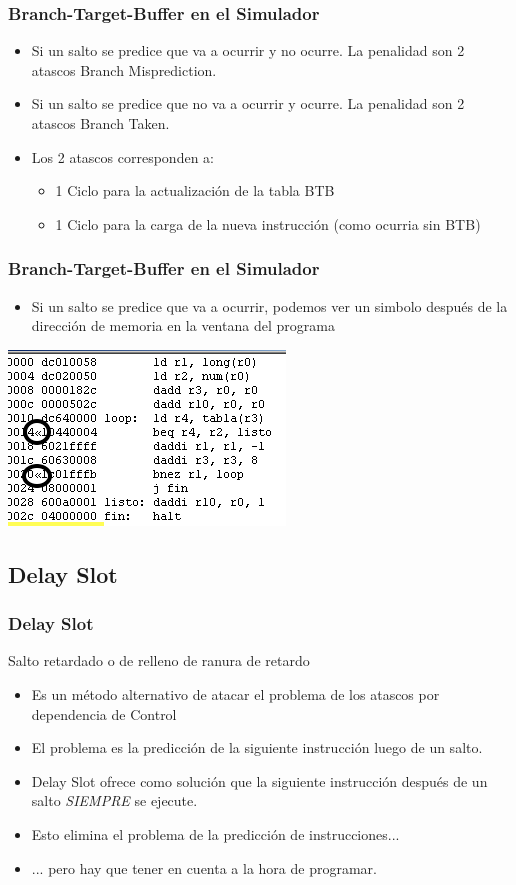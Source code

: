 \documentclass{beamer}
\begin{document}
\begin{frame}
\frametitle{Branch-Target-Buffer en el Simulador}
\begin{itemize}
\item Si un salto se predice que va a ocurrir y no ocurre. La penalidad son 2 atascos Branch Misprediction.
\item Si un salto se predice que no va a ocurrir y ocurre. La penalidad son 2 atascos Branch Taken.
\item Los 2 atascos corresponden a:
\begin{itemize}
\item 1 Ciclo para la actualización de la tabla BTB
\item 1 Ciclo para la carga de la nueva instrucción (como ocurria sin BTB)
\end{itemize}
\end{itemize}
\end{frame}

\begin{frame}
\frametitle{Branch-Target-Buffer en el Simulador}
\begin{itemize}
\item Si un salto se predice que va a ocurrir, podemos ver un simbolo después de la dirección de memoria en la ventana del programa
\end{itemize}
\includegraphics[scale=0.65]{btb.png}
\end{frame}


\subsection{Delay Slot}
\begin{frame}
\frametitle{Delay Slot}
Salto retardado o de relleno de ranura de retardo
\begin{itemize}
\item Es un método alternativo de atacar el problema de los atascos por dependencia de Control
\item El problema es la predicción de la siguiente instrucción luego de un salto.
\item Delay Slot ofrece como solución que la siguiente instrucción después de un salto \emph{SIEMPRE} se ejecute.
\item Esto elimina el problema de la predicción de instrucciones...
\item ... pero hay que tener en cuenta a la hora de programar.

\end{itemize}
\end{frame}
\end{document}
